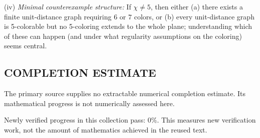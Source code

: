 (iv) \emph{Minimal counterexample structure:} If $\chi\ne 5$, then either (a) there exists a finite unit-distance graph requiring $6$ or $7$ colors, or (b) every unit-distance graph is 5-colorable but no 5-coloring extends to the whole plane; understanding which of these can happen (and under what regularity assumptions on the coloring) seems central.


\subsection*{COMPLETION ESTIMATE}
The primary source supplies no extractable numerical completion estimate. Its mathematical progress is not numerically assessed here.

Newly verified progress in this collection pass: $0\%$. This measures new verification work, not the amount of mathematics achieved in the reused text.
